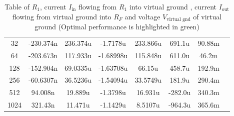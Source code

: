 \begin{table}[H]
{\begin{tabular}[t]{cccccccc}
	32 & -230.374n & 236.374u & -1.7178u & 233.866u & 691.1u & 90.88m\\ 
	\rowcolor{lg} 64 & -203.673n & 117.933u & -1.68998u & 115.848u & 611.0u & 46.2m\\ 
	128 & -152.904n & 69.0335u & -1.63708u & 66.15u & 458.7u & 192.9m\\ 
	256 & -60.6307n & 36.5236u & -1.54094u & 33.5749u & 181.9u & 290.4m\\ 
	512 & 94.008n & 19.889u & -1.3798u & 16.931u & -282.0u & 340.3m\\ 
	1024 & 321.43n & 11.471u & -1.1429u & 8.5107u & -964.3u & 365.6m\\
	\hline
\end{tabular}}
	\caption{Table of $R_1$, current $I_{\text{in}}$ flowing from $R_1$ into virtual ground , current $I_{\text{out}}$ flowing from virtual ground into $R_F$ and voltage $V_{\text{virtual gnd}}$ of virtual ground (Optimal performance is highlighted in green)}
	\label{tbl:riv}
\end{table}